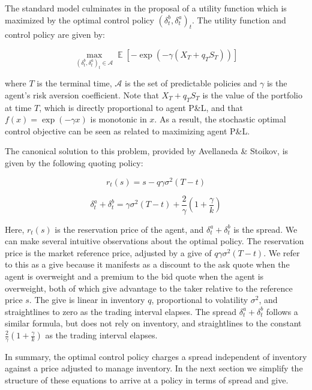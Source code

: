 \documentclass{article}
\begin{document}
The standard model culminates in the proposal of a utility function which is maximized by the optimal control policy $(\delta^b_t, \delta^a_t)_t$. The utility function and control policy are given by:

\begin{equation}
\label{eq:utility}
\max_{(\delta^b_t, \delta^a_t)_t \in \mathcal{A}} \mathop{\mathbb{E}} [ - \exp(-\gamma(X_T + q_T S_T)) ]
\end{equation}

where $T$ is the terminal time, $\mathcal{A}$ is the set of predictable policies and $\gamma$ is the agent's risk aversion coefficient. Note that $X_T + q_T S_T$ is the value of the portfolio at time $T$, which is directly proportional to agent P\&L, and that $f(x) = \exp(-\gamma x)$ is monotonic in $x$. As a result, the stochastic optimal control objective can be seen as related to maximizing agent P\&L.

The canonical solution to this problem, provided by Avellaneda \& Stoikov, is given by the following quoting policy:

\begin{equation}
\label{eq:avellanedastoikov1}
r_t(s) = s - q \gamma \sigma^2(T - t)
\end{equation}

\begin{equation}
\label{eq:avellanedastoikov2}
\delta^a_t + \delta^b_t = \gamma \sigma^2(T - t) + \frac{2}{\gamma}(1 + \frac{\gamma}{k})
\end{equation}

Here, $r_t(s)$ is the reservation price of the agent, and $\delta^a_t + \delta^b_t$ is the spread. We can make several intuitive observations about the optimal policy. The reservation price is the market reference price, adjusted by a give of $q \gamma \sigma^2(T - t)$. We refer to this as a give because it manifests as a discount to the ask quote when the agent is overweight and a premium to the bid quote when the agent is overweight, both of which give advantage to the taker relative to the reference price $s$. The give is linear in inventory $q$, proportional to volatility $\sigma^2$, and straightlines to zero as the trading interval elapses. The spread $\delta^a_t + \delta^b_t$ follows a similar formula, but does not rely on inventory, and straightlines to the constant $\frac{2}{\gamma}(1 + \frac{\gamma}{k})$ as the trading interval elapses. 

In summary, the optimal control policy charges a spread independent of inventory against a price adjusted to manage inventory. In the next section we simplify the structure of these equations to arrive at a policy in terms of spread and give.
\end{document}
